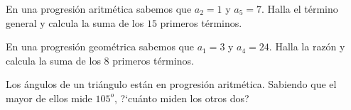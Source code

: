 \vspace{-8mm}
\begin{flushright}
\begin{footnotesize} \textcolor{gris}{}	\end{footnotesize}
\end{flushright}




\begin{mipropuesto}

En una progresión aritmética sabemos que $a_2= 1$ y $a_5=7$. Halla el término general y calcula la suma de los $15$ primeros términos.
\end{mipropuesto}

\vspace{-8mm}
\begin{flushright}
\begin{footnotesize} \textcolor{gris}{}	\end{footnotesize}
\end{flushright}


\begin{mipropuesto}

En una progresión geométrica sabemos que $a_1= 3$ y $a_4=24$. Halla la razón y calcula la suma de los $8$ primeros términos.
\end{mipropuesto}

\vspace{-8mm}
\begin{flushright}
\begin{footnotesize} \textcolor{gris}{}	\end{footnotesize}
\end{flushright}



\begin{mipropuesto}

Los ángulos de un triángulo están en progresión aritmética. Sabiendo que el mayor de ellos mide $105^o$, ?`cuánto miden los otros dos?
\end{mipropuesto}

\vspace{-8mm}
\begin{flushright}
\begin{footnotesize} \textcolor{gris}{}	\end{footnotesize}
\end{flushright}



